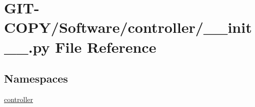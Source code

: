 \hypertarget{GIT-COPY_2Software_2controller_2____init_____8py}{}\section{G\+I\+T-\/\+C\+O\+P\+Y/\+Software/controller/\+\_\+\+\_\+init\+\_\+\+\_\+.py File Reference}
\label{GIT-COPY_2Software_2controller_2____init_____8py}
\subsection*{Namespaces}
\begin{DoxyCompactItemize}
\item 
 \hyperlink{namespacecontroller}{controller}
\end{DoxyCompactItemize}
